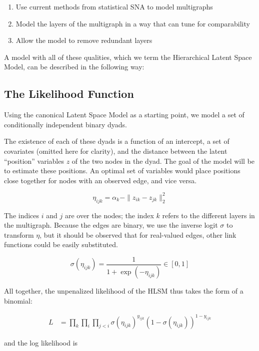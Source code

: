 \documentclass{article}
\begin{document}
\begin{enumerate}
\item Use current methods from statistical SNA to model multigraphs
\item Model the layers of the multigraph in a way that can tune for comparability
\item Allow the model to remove redundant layers
\end{enumerate}

A model with all of these qualities, which we term the Hierarchical Latent Space Model, can be described in the following way:

\subsection{The Likelihood Function}
Using the canonical Latent Space Model \cite{hoff-2002} as a starting point, we model a set of conditionally independent binary dyads. 

The existence of each of these dyads is a function of an intercept, a set of covariates (omitted here for clarity), and the distance between the latent ``position'' variables $z$ of the two nodes in the dyad. The goal of the model will be to estimate these positions. An optimal set of variables would place positions close together for nodes with an observed edge, and vice versa.

\[
\eta_{ijk} = \alpha_k - \|z_{ik} - z_{jk}\|_2^2 %
\]

The indices $i$ and $j$ are over the nodes; the index $k$ refers to the different layers in the multigraph. Because the edges are binary, we use the inverse logit $\sigma$ to transform $\eta$, but it should be observed that for real-valued edges, other link functions could be easily substituted.

\[
\sigma(\eta_{ijk}) = \frac{1}{1+\exp(-\eta_{ijk})} \in [0, 1]
\]

All together, the unpenalized likelihood of the HLSM thus takes the form of a binomial:

\begin{align*}
  L &= \prod_k \prod_{i}\prod_{j<i} \sigma(\eta_{ijk})^{y_{ijk}}(1-\sigma(\eta_{ijk}))^{1-y_{ijk}}
\end{align*}

and the log likelihood is
\end{document}
